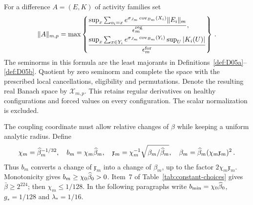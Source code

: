 For a difference $A=(E,K)$ of activity families set
\begin{equation}\label{eq:D-common-norm}
\|A\|_{m,p}=\max\left\{
\begin{aligned}
&
\frac{\sup_x\sum_{o_i=x}e^{\sigma_{J_m}\operatorname{cov}_{B_m}(X_i)}\|E_i\|_m}{\epsilon_m^{\rm reg}},\\
&\frac{\sup_x\sum_{x\in Y_i}e^{\sigma_{J_m}\operatorname{cov}_{B_m}(Y_i)}\sup_U|K_i(U)|}{\epsilon_m^{\rm for}}
\end{aligned}
\right\}\,.
\end{equation}
The seminorms in this formula are the least majorants in Definitions~\ref{def:D05a}--\ref{def:D05b}. Quotient by zero seminorm and complete the space with the prescribed local cancellations, eligibility and permutations. Denote the resulting real Banach space by $\mathcal X_{m,p}$. This retains regular derivatives on healthy configurations and forced values on every configuration. The scalar normalization is excluded.

The coupling coordinate must allow relative changes of $\beta$ while keeping a uniform analytic radius. Define
\begin{equation}\label{eq:D-coupling-coordinate}
\chi_m=\widehat{\beta}_m^{-1/32},\quad
b_m=\chi_m\widehat{\beta}_m,\quad
\mathfrak x_m=\chi_m^{-1}\sqrt{\beta_m/\widehat{\beta}_m},\quad
\beta_m=\widehat{\beta}_m(\chi_m\mathfrak x_m)^2\,.
\end{equation}
Thus $b_m$ converts a change of $\mathfrak x_m$ into a change of $\beta_m$, up to the factor $2\chi_m\mathfrak x_m$. Monotonicity gives $b_m\ge\chi_0\widehat{\beta}_0>0$. Item~7 of Table~\ref{tab:constant-choices} gives $\bar\beta\ge2^{224}$; then $\chi_m\le1/128$. In the following paragraphs write $b_{\min}=\chi_0\widehat{\beta}_0$, $g_*=1/128$ and $\lambda_*=1/16$.


